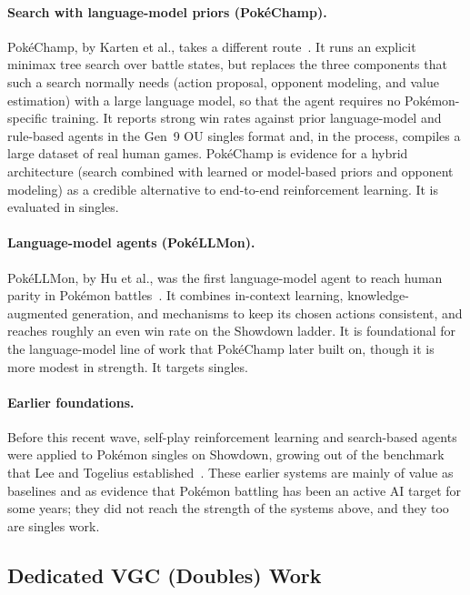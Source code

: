 \paragraph{Search with language-model priors (Pok\'{e}Champ).}
Pok\'{e}Champ, by Karten et al., takes a different route~\cite{karten2025pokechamp}.
It runs an explicit minimax tree search over battle states, but replaces the
three components that such a search normally needs (action proposal, opponent
modeling, and value estimation) with a large language model, so that the agent
requires no Pok\'{e}mon-specific training. It reports strong win rates against
prior language-model and rule-based agents in the Gen~9 OU singles format and, in
the process, compiles a large dataset of real human games. Pok\'{e}Champ is
evidence for a hybrid architecture (search combined with learned or model-based
priors and opponent modeling) as a credible alternative to end-to-end
reinforcement learning. It is evaluated in singles.

\paragraph{Language-model agents (Pok\'{e}LLMon).}
Pok\'{e}LLMon, by Hu et al., was the first language-model agent to reach human
parity in Pok\'{e}mon battles~\cite{hu2024pokellmon}. It combines in-context
learning, knowledge-augmented generation, and mechanisms to keep its chosen
actions consistent, and reaches roughly an even win rate on the Showdown ladder.
It is foundational for the language-model line of work that Pok\'{e}Champ later
built on, though it is more modest in strength. It targets singles.

\paragraph{Earlier foundations.}
Before this recent wave, self-play reinforcement learning and search-based agents
were applied to Pok\'{e}mon singles on Showdown, growing out of the benchmark that
Lee and Togelius established~\cite{lee2017showdown}. These earlier systems are
mainly of value as baselines and as evidence that Pok\'{e}mon battling has been an
active AI target for some years; they did not reach the strength of the systems
above, and they too are singles work.

\subsection{Dedicated VGC (Doubles) Work}
\label{subsec:app_vgc}

